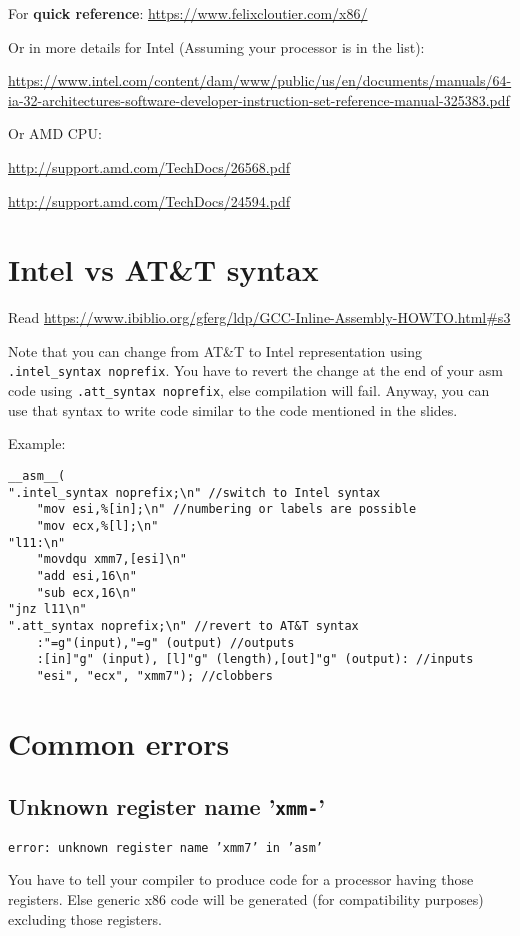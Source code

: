 \documentclass{article}
\begin{document}
For \textbf{quick reference}: \url{https://www.felixcloutier.com/x86/}

Or in more details for Intel (Assuming your processor is in the list):

\url{https://www.intel.com/content/dam/www/public/us/en/documents/manuals/64-ia-32-architectures-software-developer-instruction-set-reference-manual-325383.pdf}


Or AMD CPU:

\url{http://support.amd.com/TechDocs/26568.pdf}

\url{http://support.amd.com/TechDocs/24594.pdf}


\section{Intel vs AT\&T syntax}

Read \url{https://www.ibiblio.org/gferg/ldp/GCC-Inline-Assembly-HOWTO.html#s3}

Note that you can change from AT\&T to Intel representation using \verb+.intel_syntax noprefix+.
You have to revert the change at the end of your asm code using  \verb+.att_syntax noprefix+, else
compilation will fail.
Anyway, you can use that syntax to write code similar to the code mentioned in the slides.

Example:
\begin{verbatim}
__asm__(
".intel_syntax noprefix;\n" //switch to Intel syntax
    "mov esi,%[in];\n" //numbering or labels are possible
    "mov ecx,%[l];\n"
"l11:\n"
    "movdqu xmm7,[esi]\n"
    "add esi,16\n"
    "sub ecx,16\n"
"jnz l11\n"
".att_syntax noprefix;\n" //revert to AT&T syntax
    :"=g"(input),"=g" (output) //outputs
    :[in]"g" (input), [l]"g" (length),[out]"g" (output): //inputs
    "esi", "ecx", "xmm7"); //clobbers
\end{verbatim}


\section{Common errors}
\subsection{Unknown register name '\texttt{xmm-}'}
\texttt{error: unknown register name  'xmm7' in  'asm'}

You have to tell your compiler to produce code for a processor having those registers.
Else generic x86 code will be generated (for compatibility purposes) excluding those registers.
\end{document}
